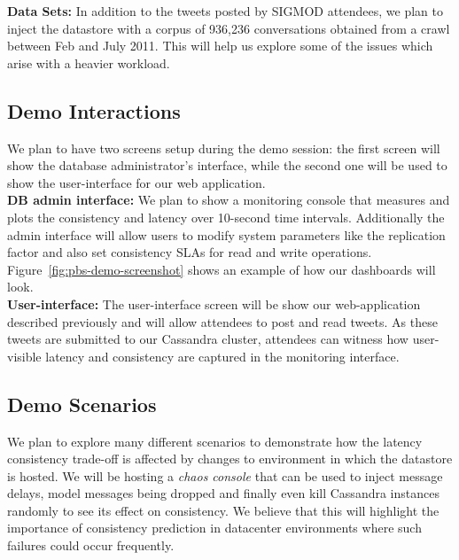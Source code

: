 \textbf{Data Sets:} In addition to the tweets posted by SIGMOD attendees, we
plan to inject the datastore with a corpus of 936,236 conversations obtained
from a crawl between Feb and July 2011. This will help us explore some of the
issues which arise with a heavier workload.

\subsection{Demo Interactions}

We plan to have two screens setup during the demo session: the first screen will
show the database administrator's interface, while the second one will be used
to show the user-interface for our web application. \\

\textbf{DB admin interface:} We plan to show a monitoring console that
measures and plots the consistency and latency over 10-second time intervals.
Additionally the admin interface will allow users to modify system parameters
like the replication factor and also set consistency SLAs for read and write
operations. Figure~\ref{fig:pbs-demo-screenshot} shows an example of how our 
dashboards will look. \\

\textbf{User-interface:} The user-interface screen will be show our
web-application described previously and will allow attendees to post and read
tweets. As these tweets are submitted to our Cassandra cluster, attendees can
witness how user-visible latency and consistency are captured in the monitoring
interface. 

\subsection{Demo Scenarios}
We plan to explore many different scenarios to demonstrate how the latency
consistency trade-off is affected by changes to environment in which the
datastore is hosted. We will be hosting a \textit{chaos console} that can be
used to inject message delays, model messages being dropped and finally even
kill Cassandra instances randomly to see its effect on consistency. We believe
that this will highlight the importance of consistency prediction in datacenter
environments where such failures could occur frequently.
